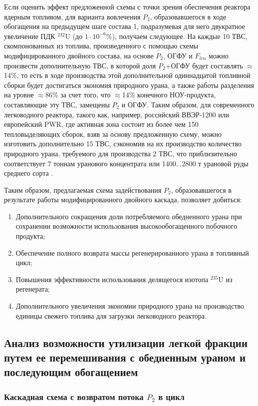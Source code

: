 Если оценить эффект предложенной схемы с точки зрения обеспечения реактора ядерным топливом, для варианта вовлечения $P_2$, образовавшегося в ходе обогащения на предыдущем шаге состава 1, подразумевая для него двукратное увеличение ПДК $^{232}$U (до $1\cdot10^{-6}$\%), получаем следующее. На каждые 10 ТВС, скомпонованных из топлива, произведенного с помощью схемы модифицированного двойного состава, на основе $P_2$, ОГФУ и $F_{leu}$ можно произвести дополнительную ТВС, в которой доля $P_2$+ОГФУ будет составлять $\approx$14\%, то есть в ходе производства этой дополнительной одиннадцатой топливной сборки будет достигаться экономия природного урана, а также работы разделения на уровне $\approx$86\% за счет того, что $\approx$14\% конечного НОУ-продукта, составляющие эту ТВС, замещены $P_2$ и ОГФУ.
Таким образом, для современного легководного реактора, такого как, например, российский ВВЭР-1200 или европейский PWR, где активная зона состоит из более чем 150 тепловыделяющих сборок, взяв за основу предложенную схему, можно изготовить дополнительно 15 ТВС, сэкономив на их производство количество природного урана, требуемого для производства 2 ТВС, что приблизительно соответствует 7 тоннам уранового концентрата или 1400...2800 т урановой руды среднего сорта \cite{bekmanYaDERNAYaFIZIKA}.

Таким образом, предлагаемая схема задействования $P_2$, образовавшегося в результате работы модифицированного двойного каскада, позволяет добиться:
\begin{enumerate}
  \item Дополнительного сокращения доли потребляемого обедненного урана при сохранении возможности использования высокообогащенного побочного продукта;
  \item Обеспечение полного возврата массы регенерированного урана в топливный цикл;
  \item Повышения эффективности использования делящегося изотопа $^{235}$U из регенерата;
  \item Дополнительного увеличения экономии природного урана на производство единицы свежего топлива для загрузки легководного реактора.
\end{enumerate}

\subsection{Анализ возможности утилизации легкой фракции путем ее перемешивания с обедненным ураном и последующим обогащением}
\subsubsection{Каскадная схема с возвратом потока $P_2$ в цикл}

